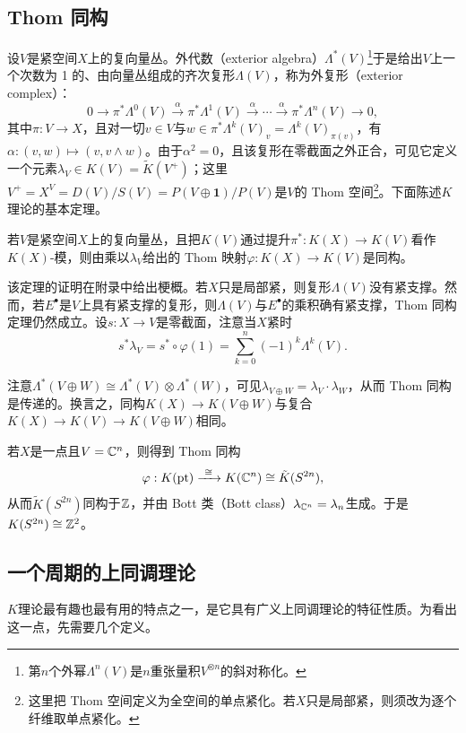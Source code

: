 \subsection{Thom 同构}
设$V$是紧空间$X$上的复向量丛。外代数（exterior algebra）$\Lambda^*(V)$\footnote{第$n$个外幂$\Lambda^n(V)$是$n$重张量积$V^{\otimes n}$的斜对称化。}于是给出$V$上一个次数为 1 的、由向量丛组成的齐次复形$\Lambda(V)$，称为外复形（exterior complex）：
\[
0\longrightarrow\pi^*\Lambda^0(V)\xrightarrow{\ \alpha\ }\pi^*\Lambda^1(V)\xrightarrow{\ \alpha\ }\cdots\xrightarrow{\ \alpha\ }\pi^*\Lambda^n(V)\longrightarrow 0,
\]
其中$\pi:V\to X$，且对一切$v\in V$与$w\in\pi^*\Lambda^k(V)_v=\Lambda^k(V)_{\pi(v)}$，有$\alpha:(v,w)\mapsto(v,v\wedge w)$。由于$\alpha^2=0$，且该复形在零截面之外正合，可见它定义一个元素$\lambda_V\in K(V)=\tilde K(V^+)$；这里$V^+=X^V=D(V)/S(V)=P(V\oplus\mathbf{1})/P(V)$是$V$的 Thom 空间\footnote{这里把 Thom 空间定义为全空间的单点紧化。若$X$只是局部紧，则须改为逐个纤维取单点紧化。}。下面陈述$K$理论的基本定理。

\begin{theorem}
若$V$是紧空间$X$上的复向量丛，且把$K(V)$通过提升$\pi^*:K(X)\to K(V)$看作$K(X)$-模，则由乘以$\lambda_V$给出的 Thom 映射$\varphi:K(X)\to K(V)$是同构。
\end{theorem}

该定理的证明在附录中给出梗概。若$X$只是局部紧，则复形$\Lambda(V)$没有紧支撑。然而，若$E^\bullet$是$V$上具有紧支撑的复形，则$\Lambda(V)$与$E^\bullet$的乘积确有紧支撑，Thom 同构定理仍然成立。设$s:X\to V$是零截面，注意当$X$紧时
\[
s^*\lambda_V=s^*\circ\varphi(1)=\sum_{k=0}^n(-1)^k\Lambda^k(V).
\]

注意$\Lambda^*(V\oplus W)\cong\Lambda^*(V)\otimes\Lambda^*(W)$，可见$\lambda_{V\oplus W}=\lambda_V\cdot\lambda_W$，从而 Thom 同构是传递的。换言之，同构$K(X)\to K(V\oplus W)$与复合$K(X)\to K(V)\to K(V\oplus W)$相同。

\begin{example}
若$X$是一点且$V=\mathbb{C}^n$，则得到 Thom 同构
\[
\varphi:K(\pt)\xrightarrow{\ \cong\ }K(\C^n)\cong\tilde K(S^{2n}),
\]
从而$\tilde K(S^{2n})$同构于$\mathbb{Z}$，并由 Bott 类（Bott class）$\lambda_{\mathbb{C}^n}=\lambda_n$生成。于是$K(S^{2n})\cong\mathbb{Z}^2$。
\end{example}

\subsection{一个周期的上同调理论}
$K$理论最有趣也最有用的特点之一，是它具有广义上同调理论的特征性质。为看出这一点，先需要几个定义。

